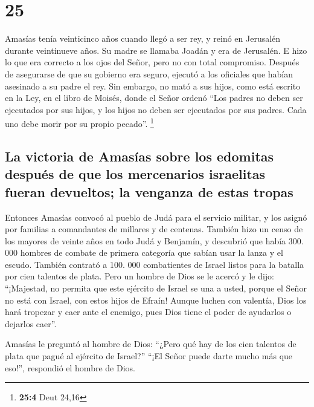 \hypertarget{section-24}{%
\section{25}\label{section-24}}

 Amasías tenía veinticinco años cuando llegó a ser rey, y
reinó en Jerusalén durante veintinueve años. Su madre se llamaba Joadán
y era de Jerusalén.  E hizo lo que era correcto a los ojos
del Señor, pero no con total compromiso.  Después de
asegurarse de que su gobierno era seguro, ejecutó a los oficiales que
habían asesinado a su padre el rey.  Sin embargo, no mató
a sus hijos, como está escrito en la Ley, en el libro de Moisés, donde
el Señor ordenó ``Los padres no deben ser ejecutados por sus hijos, y
los hijos no deben ser ejecutados por sus padres. Cada uno debe morir
por su propio pecado''. \footnote{\textbf{25:4} Deut 24,16}

\hypertarget{la-victoria-de-amasuxedas-sobre-los-edomitas-despuuxe9s-de-que-los-mercenarios-israelitas-fueran-devueltos-la-venganza-de-estas-tropas}{%
\subsection{La victoria de Amasías sobre los edomitas después de que los
mercenarios israelitas fueran devueltos; la venganza de estas
tropas}\label{la-victoria-de-amasuxedas-sobre-los-edomitas-despuuxe9s-de-que-los-mercenarios-israelitas-fueran-devueltos-la-venganza-de-estas-tropas}}

 Entonces Amasías convocó al pueblo de Judá para el
servicio militar, y los asignó por familias a comandantes de millares y
de centenas. También hizo un censo de los mayores de veinte años en todo
Judá y Benjamín, y descubrió que había 300. 000 hombres de combate de
primera categoría que sabían usar la lanza y el escudo. 
También contrató a 100. 000 combatientes de Israel listos para la
batalla por cien talentos de plata.  Pero un hombre de
Dios se le acercó y le dijo: ``¡Majestad, no permita que este ejército
de Israel se una a usted, porque el Señor no está con Israel, con estos
hijos de Efraín!  Aunque luchen con valentía, Dios los
hará tropezar y caer ante el enemigo, pues Dios tiene el poder de
ayudarlos o dejarlos caer''.

 Amasías le preguntó al hombre de Dios: ``¿Pero qué hay de
los cien talentos de plata que pagué al ejército de Israel?'' ``¡El
Señor puede darte mucho más que eso!'', respondió el hombre de Dios.

